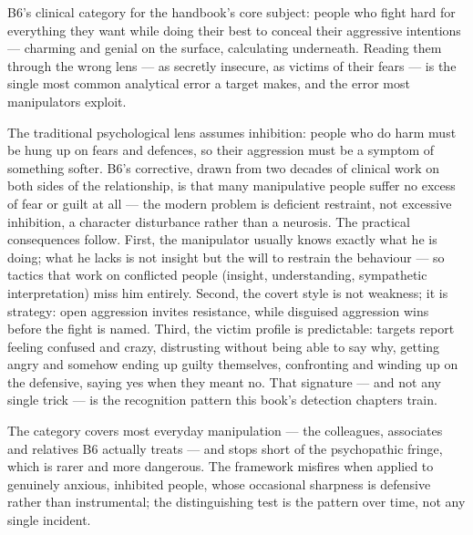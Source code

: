 \begin{core}
B6's clinical category for the handbook's core subject: people who fight hard for everything they want while doing their best to conceal their aggressive intentions --- charming and genial on the surface, calculating underneath. Reading them through the wrong lens --- as secretly insecure, as victims of their fears --- is the single most common analytical error a target makes, and the error most manipulators exploit.
\end{core}
\begin{mechanism}
The traditional psychological lens assumes inhibition: people who do harm must be hung up on fears and defences, so their aggression must be a symptom of something softer. B6's corrective, drawn from two decades of clinical work on both sides of the relationship, is that many manipulative people suffer no excess of fear or guilt at all --- the modern problem is deficient restraint, not excessive inhibition, a character disturbance rather than a neurosis. The practical consequences follow. First, the manipulator usually knows exactly what he is doing; what he lacks is not insight but the will to restrain the behaviour --- so tactics that work on conflicted people (insight, understanding, sympathetic interpretation) miss him entirely. Second, the covert style is not weakness; it is strategy: open aggression invites resistance, while disguised aggression wins before the fight is named. Third, the victim profile is predictable: targets report feeling confused and crazy, distrusting without being able to say why, getting angry and somehow ending up guilty themselves, confronting and winding up on the defensive, saying yes when they meant no. That signature --- and not any single trick --- is the recognition pattern this book's detection chapters train.
\end{mechanism}
\begin{conditions}
The category covers most everyday manipulation --- the colleagues, associates and relatives B6 actually treats --- and stops short of the psychopathic fringe, which is rarer and more dangerous. The framework misfires when applied to genuinely anxious, inhibited people, whose occasional sharpness is defensive rather than instrumental; the distinguishing test is the pattern over time, not any single incident.
\end{conditions}
